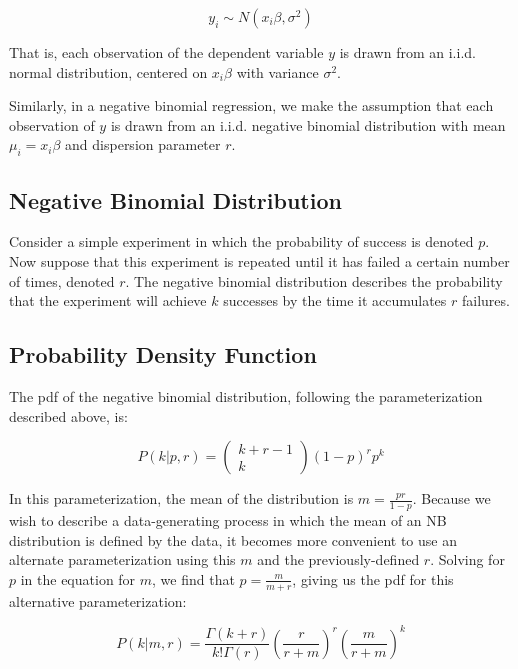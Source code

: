 \documentclass[12pt]{article}
\begin{document}
	\begin{equation}
	y_i \sim N(x_i \beta, \sigma^2)
	\end{equation}
	
	That is, each observation of the dependent variable $y$ is drawn from an i.i.d. normal distribution, centered on $x_i\beta$ with variance $\sigma^2$.
	
	Similarly, in a negative binomial regression, we make the assumption that each observation of $y$ is drawn from an i.i.d. negative binomial distribution with mean $\mu_i = x_i \beta$ and dispersion parameter $r$.
	
	\subsection{Negative Binomial Distribution}
	Consider a simple experiment in which the probability of success is denoted $p$. Now suppose that this experiment is repeated until it has failed a certain number of times, denoted $r$. The negative binomial distribution describes the probability that the experiment will achieve $k$ successes by the time it accumulates $r$ failures.
	
	\subsection{Probability Density Function}
	The pdf of the negative binomial distribution, following the parameterization described above, is:
	
	\begin{equation}
	P(k|p,r) = \begin{pmatrix}k+r-1\\k\end{pmatrix}(1-p)^rp^k
	\end{equation}
	
	In this parameterization, the mean of the distribution is $m = \frac{pr}{1-p}$. Because we wish to describe a data-generating process in which the mean of an NB distribution is defined by the data, it becomes more convenient to use an alternate parameterization using this $m$ and the previously-defined $r$. Solving for $p$ in the equation for $m$, we find that $p = \frac{m}{m+r}$, giving us the pdf for this alternative parameterization:
	
	\begin{equation}
	P(k|m, r) = \frac{\Gamma(k+r)}{k!\Gamma(r)}\left(\frac{r}{r+m}\right)^r\left(\frac{m}{r+m}\right)^k
	\end{equation}
	
\end{document}
